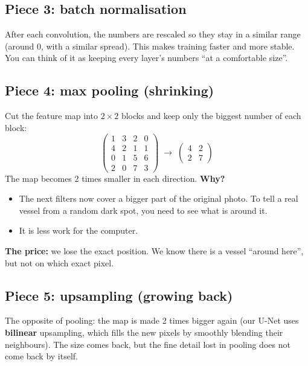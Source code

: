 \documentclass[11pt,a4paper]{article}
\begin{document}
\subsection{Piece 3: batch normalisation}
After each convolution, the numbers are rescaled so they stay in a similar range (around 0, with a similar spread). This makes training faster and more stable. You can think of it as keeping every layer's numbers ``at a comfortable size''.

\subsection{Piece 4: max pooling (shrinking)}
Cut the feature map into $2\times2$ blocks and keep only the biggest number of each block:
\[
\begin{pmatrix} 1 & 3 & 2 & 0\\ 4 & 2 & 1 & 1\\ 0 & 1 & 5 & 6\\ 2 & 0 & 7 & 3 \end{pmatrix}
\;\longrightarrow\;
\begin{pmatrix} 4 & 2\\ 2 & 7 \end{pmatrix}
\]
The map becomes 2 times smaller in each direction. \textbf{Why?}
\begin{itemize}
  \item The next filters now cover a bigger part of the original photo. To tell a real vessel from a random dark spot, you need to see what is around it.
  \item It is less work for the computer.
\end{itemize}
\textbf{The price:} we lose the exact position. We know there is a vessel ``around here'', but not on which exact pixel.

\subsection{Piece 5: upsampling (growing back)}
The opposite of pooling: the map is made 2 times bigger again (our U-Net uses \textbf{bilinear} upsampling, which fills the new pixels by smoothly blending their neighbours). The size comes back, but the fine detail lost in pooling does not come back by itself.
\end{document}
